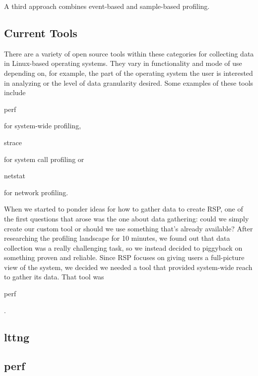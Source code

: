 \documentclass[10pt]{article}
\begin{document}
A third approach combines event-based and sample-based profiling.

\subsection{Current Tools}

There are a variety of open source tools within these categories for collecting data in Linux-based operating systems. They vary in functionality and mode of use depending on, for example, the part of the operating system the user is interested in analyzing or the level of data granularity desired. Some examples of these tools include \begin{tt}perf\end{tt} for system-wide profiling, \begin{tt}strace\end{tt} for system call profiling or \begin{tt}netstat\end{tt} for network profiling.

When we started to ponder ideas for how to gather data to create RSP, one of the first questions that arose was the one about data gathering: could we simply create our custom tool or should we use something that's already available? After researching the profiling landscape for 10 minutes, we found out that data collection was a really challenging task, so we instead decided to piggyback on something proven and reliable. Since RSP focuses on giving users a full-picture view of the system, we decided we needed a tool that provided system-wide reach to gather its data. That tool was \begin{tt}perf\end{tt}.

\subsection{lttng}

\subsection{perf}
\end{document}
